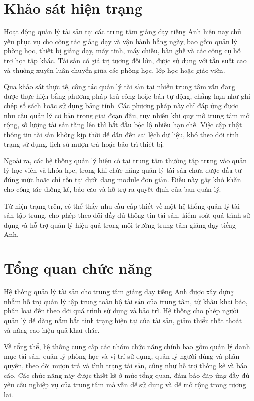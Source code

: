 \documentclass[../DoAn.tex]{subfiles}
\begin{document}
\section{Khảo sát hiện trạng}
\label{section:2.1}

Hoạt động quản lý tài sản tại các trung tâm giảng dạy tiếng Anh hiện nay chủ yếu phục vụ cho công tác giảng dạy và vận hành hằng ngày, bao gồm quản lý phòng học, thiết bị giảng dạy, máy tính, máy chiếu, bàn ghế và các công cụ hỗ trợ học tập khác. Tài sản có giá trị tương đối lớn, được sử dụng với tần suất cao và thường xuyên luân chuyển giữa các phòng học, lớp học hoặc giáo viên.

Qua khảo sát thực tế, công tác quản lý tài sản tại nhiều trung tâm vẫn đang được thực hiện bằng phương pháp thủ công hoặc bán tự động, chẳng hạn như ghi chép sổ sách hoặc sử dụng bảng tính. Các phương pháp này chỉ đáp ứng được nhu cầu quản lý cơ bản trong giai đoạn đầu, tuy nhiên khi quy mô trung tâm mở rộng, số lượng tài sản tăng lên thì bắt đầu bộc lộ nhiều hạn chế. Việc cập nhật thông tin tài sản không kịp thời dễ dẫn đến sai lệch dữ liệu, khó theo dõi tình trạng sử dụng, lịch sử mượn trả hoặc bảo trì thiết bị.

Ngoài ra, các hệ thống quản lý hiện có tại trung tâm thường tập trung vào quản lý học viên và khóa học, trong khi chức năng quản lý tài sản chưa được đầu tư đúng mức hoặc chỉ tồn tại dưới dạng module đơn giản. Điều này gây khó khăn cho công tác thống kê, báo cáo và hỗ trợ ra quyết định của ban quản lý.

Từ hiện trạng trên, có thể thấy nhu cầu cấp thiết về một hệ thống quản lý tài sản tập trung, cho phép theo dõi đầy đủ thông tin tài sản, kiểm soát quá trình sử dụng và hỗ trợ quản lý hiệu quả trong môi trường trung tâm giảng dạy tiếng Anh.


\section{Tổng quan chức năng}
\label{section:2.2}

Hệ thống quản lý tài sản cho trung tâm giảng dạy tiếng Anh được xây dựng nhằm hỗ trợ quản lý tập trung toàn bộ tài sản của trung tâm, từ khâu khai báo, phân loại đến theo dõi quá trình sử dụng và bảo trì. Hệ thống cho phép người quản lý dễ dàng nắm bắt tình trạng hiện tại của tài sản, giảm thiểu thất thoát và nâng cao hiệu quả khai thác.

Về tổng thể, hệ thống cung cấp các nhóm chức năng chính bao gồm quản lý danh mục tài sản, quản lý phòng học và vị trí sử dụng, quản lý người dùng và phân quyền, theo dõi mượn trả và tình trạng tài sản, cũng như hỗ trợ thống kê và báo cáo. Các chức năng này được thiết kế ở mức tổng quan, đảm bảo đáp ứng đầy đủ yêu cầu nghiệp vụ của trung tâm mà vẫn dễ sử dụng và dễ mở rộng trong tương lai.
\end{document}
